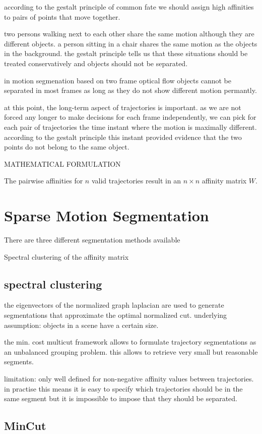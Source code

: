 according to the gestalt principle of common fate
we should assign high affinities to pairs of points that move together.

two persons walking next to each other share the same motion although they are different objects.
a person sitting in a chair shares the same motion as the objects in the background. 
the gestalt principle tells us that these situations should be treated conservatively and objects should not be separated. 

in motion segmenation based on two frame optical flow objects cannot be separated in most frames as long as they do not show different motion permantly. 

at this point, the long-term aspect of trajectories is important. as we are not forced any longer to make decisions for each frame independently, we can pick for each pair of trajectories the time instant where the motion is maximally different.
according to the gestalt principle this instant provided evidence that the two points do not belong to the same object.

MATHEMATICAL FORMULATION

The pairwise affinities for $n$ valid trajectories result in an $n \times n$ affinity matrix $W$.

\section{Sparse Motion Segmentation}
There are three different segmentation methods available


Spectral clustering of the affinity matrix


\subsection{spectral clustering}
the eigenvectors of the normalized graph laplacian are used to generate segmentations that approximate the optimal normalized cut.
underlying assumption: objects in a scene have a certain size.

the min. cost multicut framework allows to formulate trajectory segmentations as an unbalanced grouping problem. this allows to retrieve very small but reasonable segments.

limitation: only well defined for non-negative affinity values between trajectories. in practise this means it is easy to specify which trajectories should be in the same segment but it is impossible to impose that they should be separated. 
\subsection{MinCut} 

